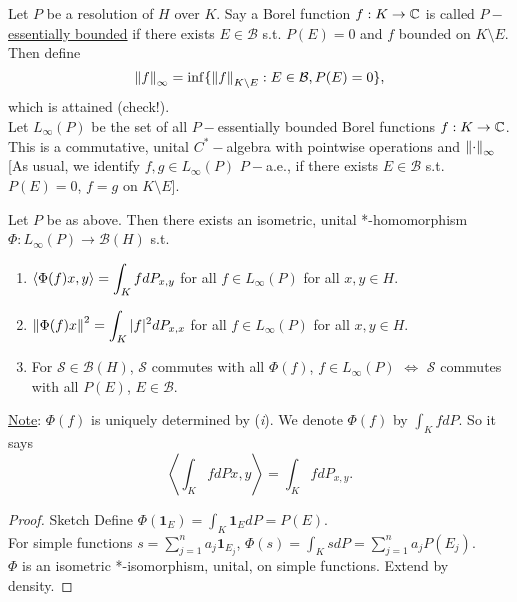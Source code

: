 \documentclass{article}
\begin{document}
\begin{boxdef}\label{def: The algebra L_infty(P)}
     Let $P$ be a resolution of $H$ over $K$. Say a Borel function $f:K\to \mathbb{C}$ is called \noindent\underline{$P-$essentially bounded} if there exists $E\in \mathcal{B}$ s.t. $P(E) = 0$ and $f$ bounded on $K\setminus E$.\\
    Then define 
    $$
    \left\lVert f\right\rVert_\infty = \inf\{\left\lVert f\right\rVert_{K\setminus E}:E\in \mathcal{B}, P(E) = 0\},
    $$
    which is attained (check!).\\
    Let $L_\infty(P)$ be the set of all $P-$essentially bounded Borel functions $f:K\to \mathbb{C}$. This is a commutative, unital $C^*-$algebra with pointwise operations and $\left\lVert\cdot\right\rVert_\infty$ [As usual, we identify $f,g\in L_\infty(P)$ $P-$a.e., if there exists $E\in \mathcal{B}$ s.t. $P(E) = 0$, $f=g$ on $K\setminus E$].
\end{boxdef}

\begin{boxlemma}\label{lemma: BFC *-HM}
    Let $P$ be as above. Then there exists an isometric, unital *-homomorphism $\Phi: L_\infty(P)\to \mathcal{B}(H)$ s.t.
    \begin{enumerate}[label = (\roman*), align = left]
        \item $\langle \Phi(f)x, y\rangle=\displaystyle\int_K fdP_{x,y}$ for all $f\in L_\infty(P)$ for all $x,y\in H$.
        \item $\left\lVert\Phi(f)x\right\rVert^2 = \displaystyle\int_K |f|^2dP_{x,x}$ for all $f\in L_\infty(P)$ for all $x,y\in H$.
        \item For $\mathcal{S}\in \mathcal{B}(H)$, $\mathcal{S}$ commutes with all $\Phi(f)$, $f\in L_\infty(P)$ $\iff$ $\mathcal{S}$ commutes with all $P(E)$, $E\in \mathcal{B}$.
    \end{enumerate}
\end{boxlemma}

\noindent\underline{Note}: $\Phi(f)$ is uniquely determined by (\textit{i}). We denote $\Phi(f)$ by $\displaystyle\int_K fdP$. So it says 
$$
\left\langle\displaystyle\int_K fdPx, y\right\rangle = \displaystyle\int_K fdP_{x,y}.
$$

\begin{proof}{Sketch}
    Define $\Phi(\mathbf{1}_E)=\int_K\mathbf{1}_EdP=P(E)$.\\
    
    For simple functions $s = \displaystyle\sum^n_{j=1}a_j\mathbf{1}_{E_j}$, $\Phi(s)=\displaystyle\int_K sdP=\displaystyle\sum^n_{j=1}a_jP(E_j)$.\\

    $\Phi$ is an isometric *-isomorphism, unital, on simple functions. Extend by density.
\end{proof}
\end{document}

